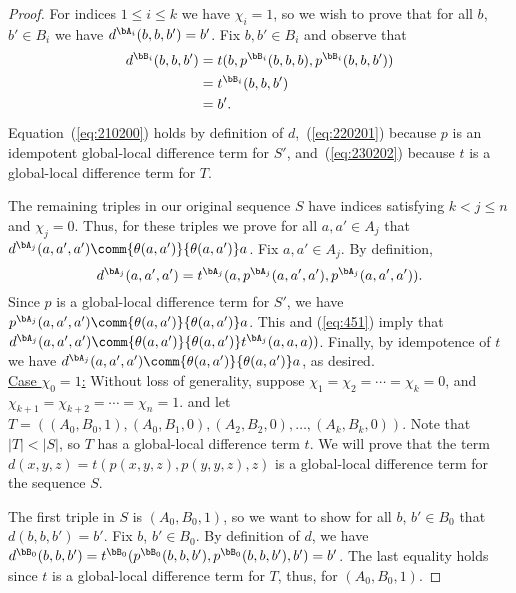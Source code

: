 \begin{proof}
For indices $1\leq i \leq k$ we have $\chi_i =1$, so we wish to prove
that for all $b$, $b' \in B_i$ we have
$d^{\bA_i}(b,b,b') = b'$.
Fix $b, b' \in B_i$ and observe that
\begin{align}
  d^{\bB_i}(b,b,b') &=
  t(b, p^{\bB_i}(b,b,b), p^{\bB_i}(b,b,b')) \label{eq:210200}\\
  &=t^{\bB_i}(b, b, b') \label{eq:220201}\\
  &=b'. \label{eq:230202}
\end{align}
Equation~(\ref{eq:210200}) holds by definition of $d$,~(\ref{eq:220201})
because $p$ is an idempotent global-local difference term for
$S'$, and~(\ref{eq:230202}) because $t$ is a global-local difference term for $T$.

The remaining triples in our original sequence $S$
have indices satisfying $k<j\leq n$ and $\chi_j = 0$.
Thus, for these triples we prove
for all $a, a' \in A_j$ that
$d^{\bA_j}(a,a',a')\comm{\theta(a,a')}{\theta(a,a')} a$.
Fix $a, a' \in A_j$.
By definition,
\begin{equation}
  \label{eq:451}
d^{\bA_j}(a,a',a') =t^{\bA_j}(a, p^{\bA_j}(a,a',a'), p^{\bA_j}(a,a',a')).  
\end{equation}
Since $p$ is a global-local difference term for $S'$, we have
$p^{\bA_j}(a,a',a') \comm{\theta(a,a')}{\theta(a,a')} a$.
This and (\ref{eq:451}) imply
that
$d^{\bA_j}(a, a',a') \comm{\theta(a,a')}{\theta(a,a')} t^{\bA_j}(a,a,a))$.
Finally, by idempotence of $t$ we have
$d^{\bA_j}(a,a',a')\comm{\theta(a,a')}{\theta(a,a')} a$,
as desired.
\\[6pt]
\underline{Case $\chi_0 = 1$:}
Without loss of generality, suppose $\chi_1 = \chi_2 =\cdots =\chi_k = 0$,
and $\chi_{k+1} = \chi_{k+2} = \cdots = \chi_{n} = 1$.
and let 
$T = ((A_0, B_0, 1), (A_0, B_1, 0), (A_2, B_2, 0), \dots, (A_k, B_k, 0))$.
Note that $|T| < |S|$, so $T$ has a
global-local difference term $t$.
We will prove that the term $d(x,y,z) = t(p(x,y,z), p(y,y,z), z)$
is a global-local difference term for the  sequence $S$.

The first triple in $S$ is $(A_0, B_0, 1)$, so we want to show for all $b$, $b' \in B_0$ that
$d(b,b,b') = b'$.
Fix $b$, $b' \in B_0$. By definition of $d$,
we have $d^{\bB_0}(b,b,b') = t^{\bB_0}(p^{\bB_0}(b,b,b'), p^{\bB_0}(b,b,b'), b') =b'$.
The last equality holds since $t$ is a global-local difference term for $T$, thus,
for $(A_0, B_0, 1)$.


\end{proof}
